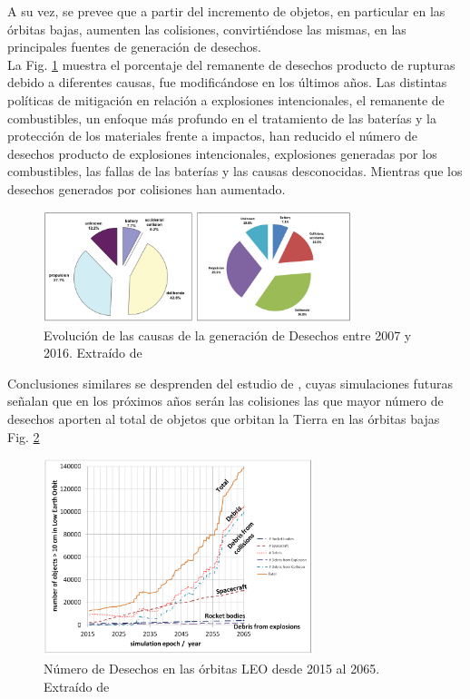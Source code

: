 A su vez, se prevee que a partir del incremento de objetos, en particular en las \'orbitas bajas, aumenten las colisiones, convirti\'endose las mismas, en las principales fuentes de generaci\'on de desechos.\\ 

La Fig. \ref{fig:causadesechos} muestra el porcentaje del remanente de desechos producto de rupturas debido a diferentes causas, fue modific\'andose en los \'ultimos a\~nos. Las distintas pol\'iticas de mitigaci\'on en relaci\'on a explosiones intencionales, el remanente de combustibles, un enfoque m\'as profundo en el tratamiento de las bater\'ias y la protecci\'on de los materiales frente a impactos, han reducido el n\'umero de desechos producto de explosiones intencionales, explosiones generadas por los combustibles, las fallas de las bater\'ias y  las causas desconocidas. Mientras que los desechos generados por colisiones han aumentado.\\

\begin{figure}[!h]
  \centering
  \includegraphics[width=0.8\textwidth]{imagenes/breakupsQNews}
  \caption[Evoluci\'on de las causas de la generaci\'on de Desechos]{Evoluci\'on de las causas de la generaci\'on de Desechos entre 2007 y 2016. Extra\'ido de \citep{ODQNum}}
  \label{fig:causadesechos}
\end{figure}

Conclusiones similares se desprenden del estudio de \citep{karacalioglu2016impact}, cuyas simulaciones futuras se\~nalan que en los pr\'oximos a\~nos ser\'an las colisiones las que mayor n\'umero de desechos aporten al total de objetos que orbitan la Tierra en las \'orbitas bajas Fig. \ref{fig:debriscollision}\\

\begin{figure}[!h]
  \centering
  \includegraphics[width=0.7\textwidth]{imagenes/debriscollision}
  \caption[N\'umero de Desechos en las \'orbitas LEO desde 2015 al 2065]{N\'umero de Desechos en las \'orbitas LEO desde 2015 al 2065. Extra\'ido de \citep{karacalioglu2016impact}}
  \label{fig:debriscollision}
\end{figure}

